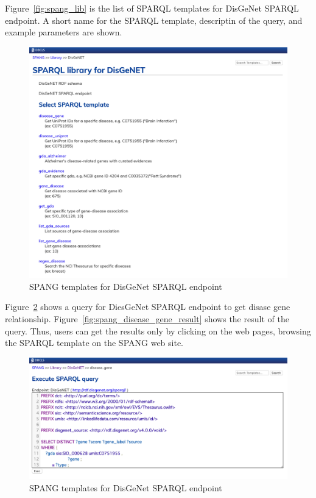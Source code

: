 \documentclass[runningheads]{llncs}
\begin{document}
Figure~\ref{fig:spang_lib} is the list of SPARQL templates for DisGeNet SPARQL endpoint.
A short name for the SPARQL template, descriptin of the query, and example parameters are shown.

\begin{figure}
\center
\includegraphics[width=1.0\textwidth]{spang_disgenet.png}
\caption{SPANG templates for DisGeNet SPARQL endpoint}
\label{fig:spang_disgenet}
\end{figure}

Figure~\ref{fig:spang_disease_gene_query} shows a query for DiesGeNet SPARQL endpoint to get disase gene relationship. 
Figure~\ref{fig:spang_disease_gene_result} shows the result of the query. Thus, users can get the results only by clicking on the web pages, browsing the SPARQL template on the SPANG web site.

\begin{figure}
\center
\includegraphics[width=1.0\textwidth]{spang_disease_gene_query.png}
\caption{SPANG templates for DisGeNet SPARQL endpoint}
\label{fig:spang_disease_gene_query}
\end{figure}
\end{document}
